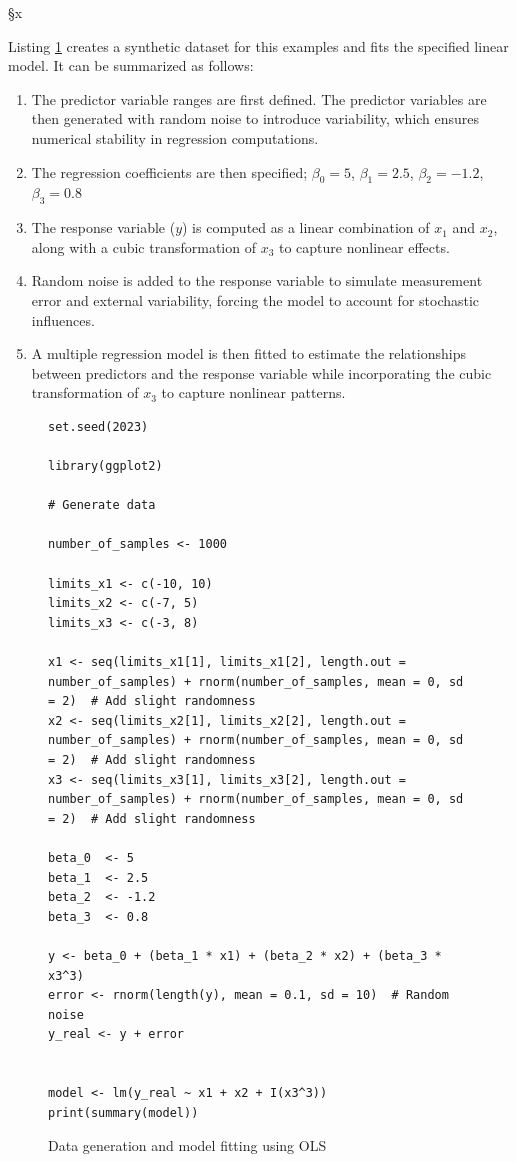 §x\documentclass[]{article}
\begin{document}
Listing \ref{lst:ols} creates a synthetic dataset for this examples and fits the specified linear model. It can be summarized as follows:

\begin{enumerate}
	\item The predictor variable ranges are first defined. The predictor variables are then generated with random noise to introduce variability, which ensures numerical stability in regression computations.  
	
	\item The regression coefficients are then specified; $\beta_0 = 5$, $\beta_1 = 2.5$, $\beta_2 = -1.2$, $\beta_3 = 0.8$
	
	\item The response variable ($y$) is computed as a linear combination of $x_1$ and $x_2$, along with a cubic transformation of $x_3$ to capture nonlinear effects.  
	
	\item Random noise is added to the response variable to simulate measurement error and external variability, forcing the model to account for stochastic influences.  
	
	\item A multiple regression model is then fitted to estimate the relationships between predictors and the response variable while incorporating the cubic transformation of $x_3$ to capture nonlinear patterns.  
\end{enumerate}


\begin{figure}[H]
	\captionsetup{type=lstlisting}
	\begin{lstlisting}
set.seed(2023)

library(ggplot2)

# Generate data

number_of_samples <- 1000

limits_x1 <- c(-10, 10)
limits_x2 <- c(-7, 5)
limits_x3 <- c(-3, 8)

x1 <- seq(limits_x1[1], limits_x1[2], length.out = number_of_samples) + rnorm(number_of_samples, mean = 0, sd = 2)  # Add slight randomness
x2 <- seq(limits_x2[1], limits_x2[2], length.out = number_of_samples) + rnorm(number_of_samples, mean = 0, sd = 2)  # Add slight randomness
x3 <- seq(limits_x3[1], limits_x3[2], length.out = number_of_samples) + rnorm(number_of_samples, mean = 0, sd = 2)  # Add slight randomness

beta_0  <- 5
beta_1  <- 2.5
beta_2  <- -1.2
beta_3  <- 0.8

y <- beta_0 + (beta_1 * x1) + (beta_2 * x2) + (beta_3 * x3^3)
error <- rnorm(length(y), mean = 0.1, sd = 10)  # Random noise
y_real <- y + error


model <- lm(y_real ~ x1 + x2 + I(x3^3))
print(summary(model))			
		\end{lstlisting}
	\caption{Data generation and model fitting using OLS}
	\label{lst:ols}
\end{figure}
\end{document}

